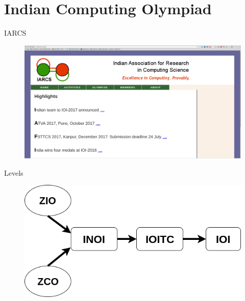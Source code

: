 \section{Indian Computing Olympiad}

\begin{frame}[fragile]{IARCS}{}
\begin{figure}
    \begin{center}
        \includegraphics[width=\linewidth]{images/iarcs.png}
    \end{center}
\end{figure}
\end{frame}

\begin{frame}[fragile]{Levels}{}
\begin{figure}
    \begin{center}
        \includegraphics[width=\linewidth]{images/ico.png}
    \end{center}
\end{figure}
\end{frame}
